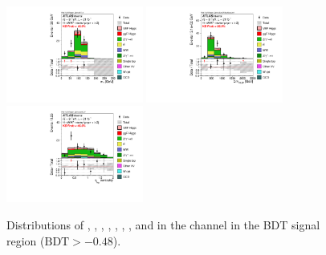 \begin{figure}[p!]
   \includegraphics[width=0.4\textwidth]{fig/analysis/BDTinputVarsInSR/SF_SR_FitRegion_MT_tr_mh125_lin.pdf}
   \includegraphics[width=0.4\textwidth]{fig/analysis/BDTinputVarsInSR/SF_SR_FitRegion_SumOFMvaMLepxJety_mh125_lin.pdf}
   \includegraphics[width=0.4\textwidth]{fig/analysis/BDTinputVarsInSR/SF_SR_FitRegion_contOLV_mh125_lin.pdf}
   \caption{Distributions
   of \dphill, \mll, \dyjj, \mjj, \pTtot, \mT, \SumMlj, and
   \lepEtaCent
   in the \eemm channel in the BDT signal region ($\textrm{BDT} > -0.48$).}
  \label{chap:analysis:fig:bdt_inputs_sr_sf}
\end{figure}


